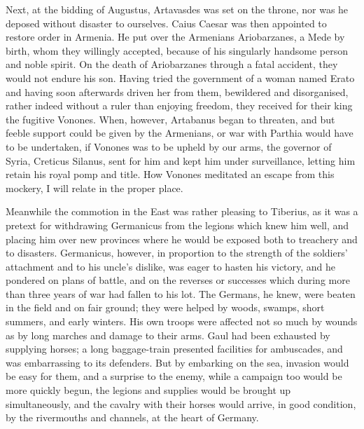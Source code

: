 Next, at the bidding of Augustus, Artavasdes was set on the throne, nor was he deposed without disaster to ourselves. Caius Caesar was then appointed to restore order in Armenia. He put over the Armenians Ariobarzanes, a Mede by birth, whom they willingly accepted, because of his singularly handsome person and noble spirit. On the death of Ariobarzanes through a fatal accident, they would not endure his son. Having tried the government of a woman named Erato and having soon afterwards driven her from them, bewildered and disorganised, rather indeed without a ruler than enjoying freedom, they received for their king the fugitive Vonones. When, however, Artabanus began to threaten, and but feeble support could be given by the Armenians, or war with Parthia would have to be undertaken, if Vonones was to be upheld by our arms, the governor of Syria, Creticus Silanus, sent for him and kept him under surveillance, letting him retain his royal pomp and title. How Vonones meditated an escape from this mockery, I will relate in the proper place.


Meanwhile the commotion in the East was rather pleasing to Tiberius, as it was a pretext for withdrawing Germanicus from the legions which knew him well, and placing him over new provinces where he would be exposed both to treachery and to disasters. Germanicus, however, in proportion to the strength of the soldiers' attachment and to his uncle's dislike, was eager to hasten his victory, and he pondered on plans of battle, and on the reverses or successes which during more than three years of war had fallen to his lot. The Germans, he knew, were beaten in the field and on fair ground; they were helped by woods, swamps, short summers, and early winters. His own troops were affected not so much by wounds as by long marches and damage to their arms. Gaul had been exhausted by supplying horses; a long baggage-train presented facilities for ambuscades, and was embarrassing to its defenders. But by embarking on the sea, invasion would be easy for them, and a surprise to the enemy, while a campaign too would be more quickly begun, the legions and supplies would be brought up simultaneously, and the cavalry with their horses would arrive, in good condition, by the rivermouths and channels, at the heart of Germany.


